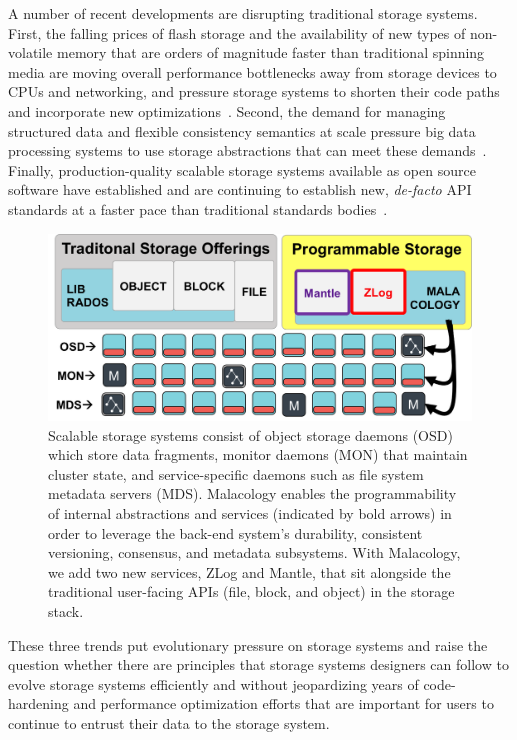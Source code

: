 \documentclass[preprint]{sigplanconf-eurosys}
\begin{document}
A number of recent developments are disrupting traditional storage systems.
First, the falling prices of flash storage and the availability of new types of
non-volatile memory that are orders of magnitude faster than traditional
spinning media are moving overall performance bottlenecks away from storage
devices to CPUs and networking, and pressure storage systems to shorten their
code paths and incorporate new
optimizations~\cite{gray_tape_2007,gray_flash_2008}. Second, the demand for
managing structured data and flexible consistency semantics at scale pressure
big data processing systems to use storage abstractions that can meet these
demands~\cite{apache_contributors_parquet_2014}. Finally, production-quality
scalable storage systems available as open source software have established and
are continuing to establish new, \emph{de-facto} API standards at a faster pace
than traditional standards
bodies~\cite{snia_implementing_2014,linux_foundation_kinetic_2015}.

\begin{figure}[tb]
\centering
\includegraphics{figures/overview.png}

\caption{Scalable storage systems consist of object storage daemons (OSD) which
store data fragments, monitor daemons (MON) that maintain cluster state, and
service-specific daemons such as file system metadata servers (MDS). Malacology
enables the programmability of internal abstractions and services (indicated by
bold arrows) in order to leverage the back-end system's durability, consistent
versioning, consensus, and metadata subsystems.  With Malacology, we add two
new services, ZLog and Mantle, that sit alongside the traditional user-facing
APIs (file, block, and object) in the storage stack.  \label{fig:overview}}
\end{figure}

These three trends put evolutionary pressure on storage systems and raise the
question whether there are principles that storage systems designers can follow
to evolve storage systems efficiently and without jeopardizing years of
code-hardening and performance optimization efforts that are important for
users to continue to entrust their data to the storage system.
\end{document}
